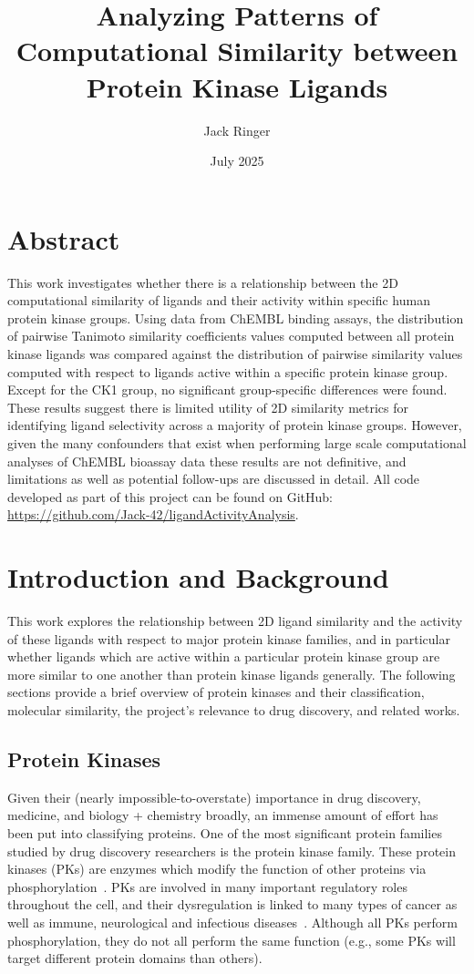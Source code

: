 \documentclass[11pt]{article}
\title{Analyzing Patterns of Computational Similarity between Protein Kinase Ligands}
\author{Jack Ringer}
\date{July 2025}
\begin{document}
\maketitle


\section{Abstract}
This work investigates whether there is a relationship between the 2D computational similarity of ligands and their activity within specific human protein kinase groups.  
Using data from ChEMBL binding assays, the distribution of pairwise Tanimoto similarity coefficients values computed between all protein kinase ligands was compared against the distribution of pairwise similarity values computed with respect to ligands active within a specific protein kinase group. 
Except for the CK1 group, no significant group-specific differences were found. 
These results suggest there is limited utility of 2D similarity metrics for identifying ligand selectivity across a majority of protein kinase groups. 
However, given the many confounders that exist when performing large scale computational analyses of ChEMBL bioassay data these results are not definitive, and limitations as well as potential follow-ups are discussed in detail. 
All code developed as part of this project can be found on GitHub: \href{https://github.com/Jack-42/ligandActivityAnalysis}{https://github.com/Jack-42/ligandActivityAnalysis}. 

\section{Introduction and Background}
This work explores the relationship between 2D ligand similarity and the activity of these ligands with respect to major protein kinase families, and in particular whether ligands which are active within a particular protein kinase group are more similar to one another than protein kinase ligands generally. 
The following sections provide a brief overview of protein kinases and their classification, molecular similarity, the project's relevance to drug discovery, and related works.


\subsection{Protein Kinases}
Given their (nearly impossible-to-overstate) importance in drug discovery, medicine, and biology + chemistry broadly, an immense amount of effort has been put into classifying proteins. 
One of the most significant protein families studied by drug discovery researchers is the protein kinase family. 
These protein kinases (PKs) are enzymes which modify the function of other proteins via phosphorylation~\cite{lubos_cipak_2022}. 
PKs are involved in many important regulatory roles throughout the cell, and their dysregulation is linked to many types of cancer as well as immune, neurological and infectious diseases~\cite{bhullar_lagaron_mcgowan_parmar_jha_hubbard_rupasinghe_2018}. 
Although all PKs perform phosphorylation, they do not all perform the same function (e.g., some PKs will target different protein domains than others). 
\end{document}
